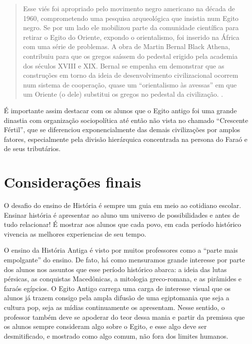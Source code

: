 \begin{refsection}
    \begin{quotation}
        Esse viés foi apropriado pelo movimento negro americano na década de 1960, comprometendo uma pesquisa arqueológica que insistia num Egito negro. Se por um lado ele mobilizou parte da comunidade científica para retirar o Egito do Oriente, expondo o orientalismo, foi inserido na África com uma série de problemas. A obra de Martin Bernal Black Athena, contribuiu para que os gregos saíssem do pedestal erigido pela academia dos séculos XVIII e XIX. Bernal se empenha em demonstrar que as construções em torno da ideia de desenvolvimento civilizacional ocorrem num sistema de cooperação, quase um ``orientalismo às avessas'' em que um Oriente (o dele) substitui os gregos no pedestal da civilização. \cite[p.~287]{Silva2014Sorriso}.
    \end{quotation}

    É importante assim destacar com os alunos que o Egito antigo foi uma grande dinastia com organização sociopolítica até então não vista no chamado ``Crescente Fértil'', que se diferenciou exponencialmente das demais civilizações por amplos fatores, especialmente pela divisão hierárquica concentrada na persona do Faraó e de seus tributários.     

    \section{Considerações finais}

    O desafio do ensino de História é sempre um guia em meio ao cotidiano escolar. Ensinar história é apresentar ao aluno um universo de possibilidades e antes de tudo relacionar! É mostrar aos alunos que cada povo, em cada período histórico vivencia as melhores experiencias de seu tempo.   

    O ensino da História Antiga é visto por muitos professores como a ``parte mais empolgante'' do ensino. De fato, há como mensuramos grande interesse por parte dos alunos nos assuntos que esse período histórico abarca: a ideia das lutas pérsicas, as conquistas Macedônicas, a mitologia greco-romana, e as pirâmides e faraós egípcios. O Egito Antigo carrega uma carga de interesse visual que os alunos já trazem consigo pela ampla difusão de uma egiptomania que seja a cultura pop, seja as mídias continuamente os apresentam. Nesse sentido, o professor também deve se apoderar do teor dessa mania e partir da premissa que os alunos sempre consideram algo sobre o Egito, e esse algo deve ser desmitificado, e mostrado como algo comum, não fora dos limites humanos.  


\end{refsection}
